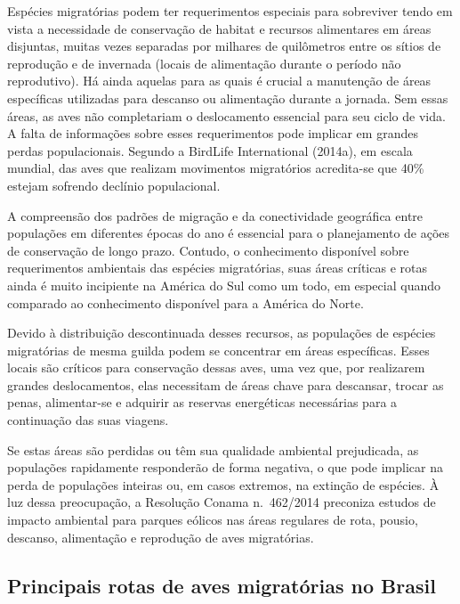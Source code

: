 \documentclass[
]{scrbook}
\begin{document}
Espécies migratórias podem ter requerimentos especiais para sobreviver tendo em vista a necessidade de conservação de habitat e recursos alimentares em áreas disjuntas, muitas vezes separadas por milhares de quilômetros entre os sítios de reprodução e de invernada (locais de alimentação durante o período não reprodutivo). Há ainda aquelas para as quais é crucial a manutenção de áreas específicas utilizadas para descanso ou alimentação durante a jornada. Sem essas áreas, as aves não completariam o deslocamento essencial para seu ciclo de vida. A falta de informações sobre esses requerimentos pode implicar em grandes perdas populacionais. Segundo a BirdLife International (2014a), em escala mundial, das aves que realizam movimentos migratórios acredita-se que 40\% estejam sofrendo declínio populacional.

A compreensão dos padrões de migração e da conectividade geográfica entre populações em diferentes épocas do ano é essencial para o planejamento de ações de conservação de longo prazo. Contudo, o conhecimento disponível sobre requerimentos ambientais das espécies migratórias, suas áreas críticas e rotas ainda é muito incipiente na América do Sul como um todo, em especial quando comparado ao conhecimento disponível para a América do Norte.

Devido à distribuição descontinuada desses recursos, as populações de espécies migratórias de mesma guilda podem se concentrar em áreas específicas. Esses locais são críticos para conservação dessas aves, uma vez que, por realizarem grandes deslocamentos, elas necessitam de áreas chave para descansar, trocar as penas, alimentar-se e adquirir as reservas energéticas necessárias para a continuação das suas viagens.

Se estas áreas são perdidas ou têm sua qualidade ambiental prejudicada, as populações rapidamente responderão de forma negativa, o que pode implicar na perda de populações inteiras ou, em casos extremos, na extinção de espécies. À luz dessa preocupação, a Resolução Conama n.~462/2014 preconiza estudos de impacto ambiental para parques eólicos nas áreas regulares de rota, pousio, descanso, alimentação e reprodução de aves migratórias.

\hypertarget{rotas}{%
\subsection{Principais rotas de aves migratórias no Brasil}\label{rotas}}
\end{document}
